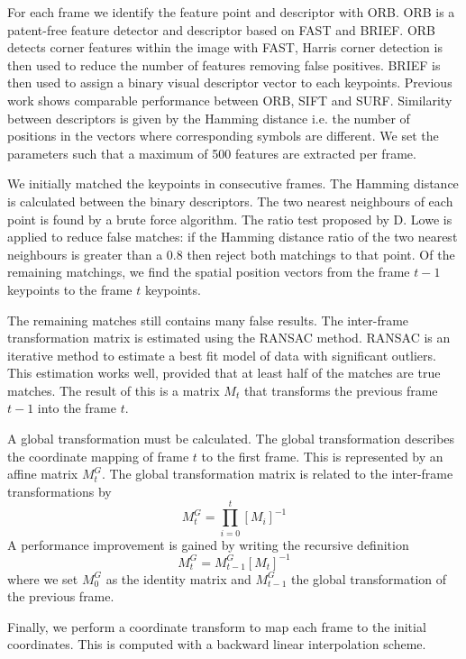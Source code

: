 For each frame we identify the feature point and descriptor with ORB.
ORB is a patent-free feature detector and descriptor based on FAST and BRIEF\cite{Rublee2011}.
ORB detects corner features within the image with FAST,
Harris corner detection is then used to reduce the number of features removing false positives.
BRIEF is then used to assign a binary visual descriptor vector to each keypoints.
Previous work shows comparable performance between ORB, SIFT and SURF\cite{Karami2017}.
Similarity between descriptors is given by the Hamming distance 
i.e. the number of positions in the vectors where corresponding symbols are different.
We set the parameters such that a maximum of 500 features are extracted per frame.

We initially matched the keypoints in consecutive frames.
The Hamming distance is calculated between the binary descriptors.
The two nearest neighbours of each point is found by a brute force algorithm.
The ratio test proposed by D. Lowe\cite{Lowe2004} is applied to reduce false matches:
if the Hamming distance ratio of the two nearest neighbours is greater than a 0.8 then reject both matchings to that point.
Of the remaining matchings, we find the spatial position vectors from the frame $t-1$ keypoints to the frame $t$ keypoints.

The remaining matches still contains many false results.
The inter-frame transformation matrix is estimated using the RANSAC method\cite{Fischler1981}.
RANSAC is an iterative method to estimate a best fit model of data with significant outliers.
This estimation works well, provided that at least half of the matches are true matches.
The result of this is a matrix $M_t$ that transforms the previous frame $t-1$ into the frame $t$.

A global transformation must be calculated.
The global transformation describes the coordinate mapping of frame $t$ to the first frame.
This is represented by an affine matrix $M^G_t$.
The global transformation matrix is related to the inter-frame transformations by
\begin{equation}
	M^G_t =  \prod^{t}_{i=0}[ M_i ]^{-1}
\end{equation}
A performance improvement is gained by writing the recursive definition
\begin{equation}
  M^G_t = M^G_{t-1}[M_t]^{-1}
\end{equation}
where we set $M^G_0$ as the identity matrix and $M^G_{t-1}$ the global transformation of the previous frame.

Finally, we perform a coordinate transform to map each frame to the initial coordinates.
This is computed with a backward linear interpolation scheme. 



